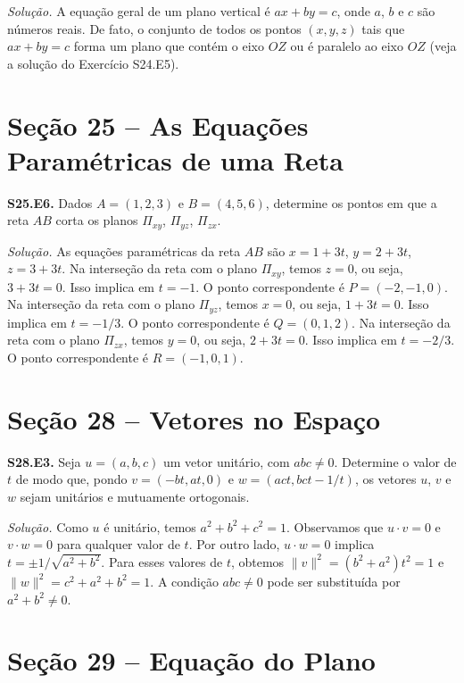 \documentclass[a4paper,11pt]{article}
\begin{document}
\emph{Solução.}
A equação geral de um plano vertical é $ax + by = c$, onde $a$, $b$ e $c$ são números reais.
De fato, o conjunto de todos os pontos $(x,y,z)$ tais que $ax + by = c$ forma um plano que contém o eixo $OZ$ ou é paralelo ao eixo $OZ$ (veja a solução do Exercício S24.E5).

\section*{Seção 25 -- As Equações Paramétricas de uma Reta}

\textbf{S25.E6.}
Dados $A = (1,2,3)$ e $B = (4,5,6)$, determine os pontos em que a reta $AB$ corta os planos $\Pi_{xy}$, $\Pi_{yz}$, $\Pi_{zx}$.

\vspace{\baselineskip}

\emph{Solução.}
As equações paramétricas da reta $AB$ são $x = 1 + 3t$, $y = 2 + 3t$, $z = 3 + 3t$.
Na interseção da reta com o plano $\Pi_{xy}$, temos $z = 0$, ou seja, $3 + 3t = 0$.
Isso implica em $t = -1$.
O ponto correspondente é $P = (-2,-1,0)$.
Na interseção da reta com o plano $\Pi_{yz}$, temos $x = 0$, ou seja, $1 + 3t = 0$.
Isso implica em $t = -1/3$.
O ponto correspondente é $Q = (0,1,2)$.
Na interseção da reta com o plano $\Pi_{zx}$, temos $y = 0$, ou seja, $2 + 3t = 0$.
Isso implica em $t = -2/3$.
O ponto correspondente é $R = (-1,0,1)$.

\section*{Seção 28 -- Vetores no Espaço}

\textbf{S28.E3.}
Seja $u = (a, b, c)$ um vetor unitário, com $abc \neq 0$.
Determine o valor de $t$ de modo que, pondo $v = (-bt, at, 0)$ e $w = (act, bct -1/t)$, os vetores $u$, $v$ e $w$ sejam unitários e mutuamente ortogonais.

\vspace{\baselineskip}

\emph{Solução.}
Como $u$ é unitário, temos $a^2 + b^2 + c^2 = 1$.
Observamos que $u \cdot v = 0$ e $v \cdot w = 0$ para qualquer valor de $t$.
Por outro lado, $u \cdot w = 0$ implica $t = \pm 1/\sqrt{a^2 + b^2}$.
Para esses valores de $t$, obtemos $\| v \|^2 = (b^2 + a^2)t^2 = 1$ e $\| w \|^2 = c^2 + a^2 + b^2 = 1$.
A condição $abc \neq 0$ pode ser substituída por $a^2 + b^2 \neq 0$.

\section*{Seção 29 -- Equação do Plano}
\end{document}
